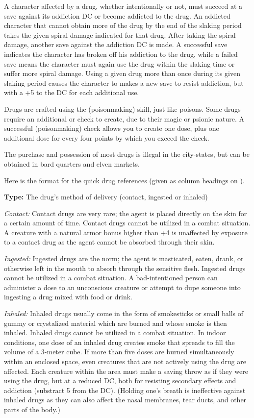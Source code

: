 A character affected by a drug, whether intentionally or not, must succeed at a save against its addiction DC or become addicted to the drug. An addicted character that cannot obtain more of the drug by the end of the slaking period takes the given spiral damage indicated for that drug. After taking the spiral damage, another save against the addiction DC is made. A successful save indicates the character has broken off his addiction to the drug, while a failed save means the character must again use the drug within the slaking time or suffer more spiral damage. Using a given drug more than once during its given slaking period causes the character to makes a new save to resist addiction, but with a +5 to the DC for each additional use.

Drugs are crafted using the  (poisonmaking) skill, just like poisons. Some drugs require an additional  or  check to create, due to their magic or psionic nature. A successful  (poisonmaking) check allows you to create one dose, plus one additional dose for every four points by which you exceed the  check.

The purchase and possession of most drugs is illegal in the city-states, but can be obtained in bard quarters and elven markets.

Here is the format for the quick drug references (given as column headings on ).

\textbf{Type:} The drug's method of delivery (contact, ingested or inhaled)

\textit{Contact:} Contact drugs are very rare; the agent is placed directly on the skin for a certain amount of time. Contact drugs cannot be utilized in a combat situation. A creature with a natural armor bonus higher than +4 is unaffected by exposure to a contact drug as the agent cannot be absorbed through their skin.

\textit{Ingested:} Ingested drugs are the norm; the agent is masticated, eaten, drank, or otherwise left in the mouth to absorb through the sensitive flesh. Ingested drugs cannot be utilized in a combat situation. A bad-intentioned person can administer a dose to an unconscious creature or attempt to dupe someone into ingesting a drug mixed with food or drink.

\textit{Inhaled:} Inhaled drugs usually come in the form of smokesticks or small balls of gummy or crystalized material which are burned and whose smoke is then inhaled. Inhaled drugs cannot be utilized in a combat situation. In indoor conditions, one dose of an inhaled drug creates smoke that spreads to fill the volume of a 3-meter cube. If more than five doses are burned simultaneously within an enclosed space, even creatures that are not actively using the drug are affected. Each creature within the area must make a saving throw as if they were using the drug, but at a reduced DC, both for resisting secondary effects and addiction (substract 5 from the DC). (Holding one's breath is ineffective against inhaled drugs as they can also affect the nasal membranes, tear ducts, and other parts of the body.)

